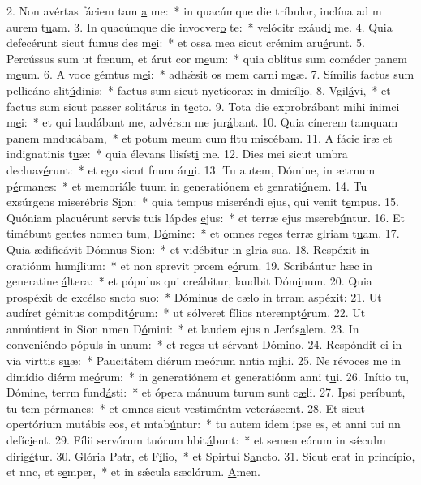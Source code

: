 2. Non avértas fáciem tam \uline{a} me:~* in quacúmque die tríbulor, inclína ad m aurem t\uline{u}am.
3. In quacúmque die invocver\uline{o} te:~* velócitr exáud\uline{i} me.
4. Quia defecérunt sicut fumus des m\uline{e}i:~* et ossa mea sicut crémim aru\uline{é}runt.
5. Percússus sum ut fœnum, et árut cor m\uline{e}um:~* quia oblítus sum coméder panem m\uline{e}um.
6. A voce gémtus m\uline{e}i:~* adhǽsit os mem carni m\uline{e}æ.
7. Símilis factus sum pellicáno slit\uline{ú}dinis:~* factus sum sicut nyctícorax in dmicíl\uline{i}o.
8. Vgil\uline{á}vi,~* et factus sum sicut passer solitárus in t\uline{e}cto.
9. Tota die exprobrábant mihi inimci m\uline{e}i:~* et qui laudábant me, advérsm me jur\uline{á}bant.
10. Quia cínerem tamquam panem mnduc\uline{á}bam,~* et potum meum cum fltu misc\uline{é}bam.
11. A fácie iræ et indignatinis t\uline{u}æ:~* quia élevans llisíst\uline{i} me.
12. Dies mei sicut umbra declnav\uline{é}runt:~* et ego sicut fnum ár\uline{u}i.
13. Tu autem, Dómine, in ætrnum p\uline{é}rmanes:~* et memoriále tuum in generatiónem et genrati\uline{ó}nem.
14. Tu exsúrgens miserébris S\uline{i}on:~* quia tempus miseréndi ejus, qui venit t\uline{e}mpus.
15. Quóniam placuérunt servis tuis lápdes \uline{e}jus:~* et terræ ejus msereb\uline{ú}ntur.
16. Et timébunt gentes nomen tum, D\uline{ó}mine:~* et omnes reges terræ glriam t\uline{u}am.
17. Quia ædificávit Dómnus S\uline{i}on:~* et vidébitur in glria s\uline{u}a.
18. Respéxit in oratiónm hum\uline{í}lium:~* et non sprevit prcem e\uline{ó}rum.
19. Scribántur hæc in generatine \uline{á}ltera:~* et pópulus qui creábitur, laudbit Dóm\uline{i}num.
20. Quia prospéxit de excélso sncto s\uline{u}o:~* Dóminus de cælo in trram asp\uline{é}xit:
21. Ut audíret gémitus compdit\uline{ó}rum:~* ut sólveret fílios nterempt\uline{ó}rum.
22. Ut annúntient in Sion nmen D\uline{ó}mini:~* et laudem ejus n Jerús\uline{a}lem.
23. In conveniéndo pópuls in \uline{u}num:~* et reges ut sérvant Dóm\uline{i}no.
24. Respóndit ei in via virttis s\uline{u}æ:~* Paucitátem diérum meórum nntia m\uline{i}hi.
25. Ne révoces me in dimídio diérm me\uline{ó}rum:~* in generatiónem et generatiónm anni t\uline{u}i.
26. Inítio tu, Dómine, terrm fund\uline{á}sti:~* et ópera mánuum turum sunt c\uline{æ}li.
27. Ipsi períbunt, tu tem p\uline{é}rmanes:~* et omnes sicut vestiméntm veter\uline{á}scent.
28. Et sicut opertórium mutábis eos, et mtab\uline{ú}ntur:~* tu autem idem ipse es, et anni tui nn defíc\uline{i}ent.
29. Fílii servórum tuórum hbit\uline{á}bunt:~* et semen eórum in sǽculm dirig\uline{é}tur.
30. Glória Patr, et F\uline{í}lio,~* et Spirtui S\uline{a}ncto.
31. Sicut erat in princípio, et nnc, et s\uline{e}mper,~* et in sǽcula sæclórum. \uline{A}men.
